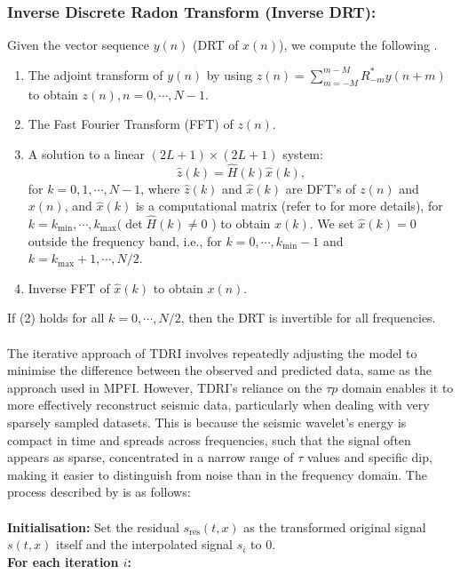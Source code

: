 \subsubsection{Inverse Discrete Radon Transform (Inverse DRT):} %
\noindent Given the vector sequence $y(n)$ (DRT of $x(n)$), we compute the following \cite{beylkin1987discrete}.
\begin{enumerate}
\item The adjoint transform of $y(n)$ by using $z(n)=\sum_{m=-M}^{m-M} R_{-m}^* y(n+m)$ to obtain $z(n), n=0, \cdots, N-1$.
\item The Fast Fourier Transform (FFT) of $z(n)$.
\item A solution to a linear $(2 L+1) \times(2 L+1)$ system:
$$\hat{z}(k)=\hat{H}(k) \hat{x}(k),$$
for $k=0,1, \cdots, N-1$, where $\hat{z}(k)$ and $\hat{x}(k)$ are DFT's of $z(n)$ and $x(n)$, and $\hat{x}(k)$ is a computational matrix (refer to  for more details), for $k=k_{\min }, \cdots, k_{\max }(\operatorname{det} \hat{H}(k) \neq 0$ ) to obtain $\hat{x}(k)$. We set $\hat{x}(k)=0$ outside the frequency band, i.e., for $k=0, \cdots, k_{\min }-1$ and $k=k_{\max }+1, \cdots, N / 2$.
\item Inverse FFT of $\hat{x}(k)$ to obtain $x(n)$.
\end{enumerate}
\noindent If (2) holds for all $k=0, \cdots, N / 2$, then the DRT is invertible for all frequencies.
\\\\
The iterative approach of TDRI involves repeatedly adjusting the model to minimise the difference between the observed and predicted data, same as the approach used in MPFI. However, TDRI's reliance on the $\tau p$ domain enables it to more effectively reconstruct seismic data, particularly when dealing with very sparsely sampled datasets. This is because the seismic wavelet's energy is compact in time and spreads across frequencies, such that the signal often appears as sparse, concentrated in a narrow range of $\tau$ values and specific dip, making it easier to distinguish from noise than in the frequency domain. The process described by  is as follows:
\\\\
\textbf{Initialisation:} Set the residual $s_{\text{res}}(t,x)$ as the transformed original signal $s(t,x)$ itself and the interpolated signal $s_i$ to 0.
\\
\noindent \textbf{For each iteration $i$:}
